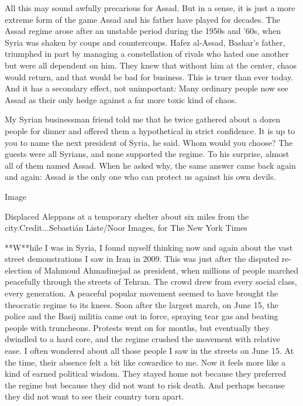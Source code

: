 All this may sound awfully precarious for Assad. But in a sense, it is
just a more extreme form of the game Assad and his father have played
for decades. The Assad regime arose after an unstable period during the
1950s and '60s, when Syria was shaken by coups and countercoups. Hafez
al-Assad, Bashar's father, triumphed in part by managing a constellation
of rivals who hated one another but were all dependent on him. They knew
that without him at the center, chaos would return, and that would be
bad for business. This is truer than ever today. And it has a secondary
effect, not unimportant: Many ordinary people now see Assad as their
only hedge against a far more toxic kind of chaos.

My Syrian businessman friend told me that he twice gathered about a
dozen people for dinner and offered them a hypothetical in strict
confidence. It is up to you to name the next president of Syria, he
said. Whom would you choose? The guests were all Syrians, and none
supported the regime. To his surprise, almost all of them named Assad.
When he asked why, the same answer came back again and again: Assad is
the only one who can protect us against his own devils.

Image

Displaced Aleppans at a temporary shelter about six miles from the
city.Credit...Sebastián Liste/Noor Images, for The New York Times

**W**hile I was in Syria, I found myself thinking now and again about
the vast street demonstrations I saw in Iran in 2009. This was just
after the disputed re-election of Mahmoud Ahmadinejad as president, when
millions of people marched peacefully through the streets of Tehran. The
crowd drew from every social class, every generation. A peaceful popular
movement seemed to have brought the theocratic regime to its knees. Soon
after the largest march, on June 15, the police and the Basij militia
came out in force, spraying tear gas and beating people with truncheons.
Protests went on for months, but eventually they dwindled to a hard
core, and the regime crushed the movement with relative ease. I often
wondered about all those people I saw in the streets on June 15. At the
time, their absence felt a bit like cowardice to me. Now it feels more
like a kind of earned political wisdom. They stayed home not because
they preferred the regime but because they did not want to risk death.
And perhaps because they did not want to see their country torn apart.

